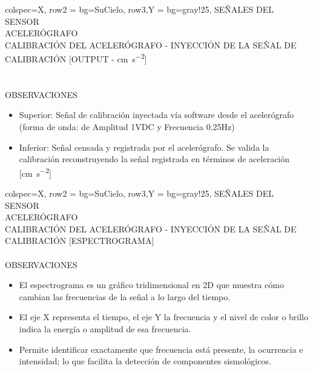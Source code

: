 \begin{tblr}{
        colspec={X},
        row{2} = {bg=SuCielo},
        row{3,Y} = {bg=gray!25},
    } %
    SEÑALES DEL SENSOR \\
    ACELERÓGRAFO \MakeUppercase{} \\
    CALIBRACIÓN DEL ACELERÓGRAFO - INYECCIÓN DE LA SEÑAL DE CALIBRACIÓN [OUTPUT - \unit{\centi\meter\per\square\second}] \\
     \\
             \\
    OBSERVACIONES \\
    \begin{itemize}
        \item Superior: Señal de calibración inyectada vía software desde el acelerógrafo (forma de onda:  de Amplitud 1VDC y Frecuencia 0.25Hz)
        \item Inferior: Señal censada y registrada por el acelerógrafo. Se valida la calibración reconstruyendo la señal registrada en términos de aceleración [\unit{\centi\meter\per\square\second}]
    \end{itemize}
\end{tblr}
% 
\newpage
\begin{tblr}{
        colspec={X},
        row{2} = {bg=SuCielo},
        row{3,Y} = {bg=gray!25},
    } %
    SEÑALES DEL SENSOR \\
    ACELERÓGRAFO \MakeUppercase{} \\
    CALIBRACIÓN DEL ACELERÓGRAFO - INYECCIÓN DE LA SEÑAL DE CALIBRACIÓN [ESPECTROGRAMA] \\
             \\
    OBSERVACIONES \\
    \begin{itemize}
        \item El espectrograma es un gráfico tridimensional en 2D que muestra cómo cambian las frecuencias de la señal a lo largo del tiempo.
        \item El eje X representa el tiempo, el eje Y la frecuencia y el nivel de color o brillo indica la energía o amplitud de esa frecuencia.
        \item Permite identificar exactamente que frecuencia está presente, la ocurrencia e intensidad; lo que facilita la detección de componentes sismológicos.
    \end{itemize}
\end{tblr}
% 
